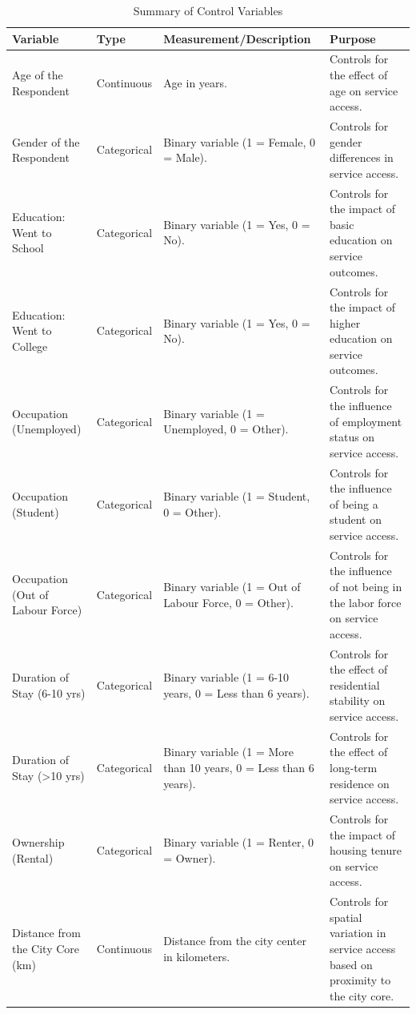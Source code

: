 \begin{table}[H]
\small  %
\centering
\caption{Summary of Control Variables}
\begin{tabularx}{\textwidth}{|p{3cm}|p{2.5cm}|p{5cm}|p{5cm}|}
\hline
\textbf{Variable} & \textbf{Type} & \textbf{Measurement/Description} & \textbf{Purpose} \\
\hline
Age of the Respondent & Continuous & Age in years. & Controls for the effect of age on service access. \\
\hline
Gender of the Respondent & Categorical & Binary variable (1 = Female, 0 = Male). & Controls for gender differences in service access. \\
\hline
Education: Went to School & Categorical & Binary variable (1 = Yes, 0 = No). & Controls for the impact of basic education on service outcomes. \\
\hline
Education: Went to College & Categorical & Binary variable (1 = Yes, 0 = No). & Controls for the impact of higher education on service outcomes. \\
\hline
Occupation (Unemployed) & Categorical & Binary variable (1 = Unemployed, 0 = Other). & Controls for the influence of employment status on service access. \\
\hline
Occupation (Student) & Categorical & Binary variable (1 = Student, 0 = Other). & Controls for the influence of being a student on service access. \\
\hline
Occupation (Out of Labour Force) & Categorical & Binary variable (1 = Out of Labour Force, 0 = Other). & Controls for the influence of not being in the labor force on service access. \\
\hline
Duration of Stay (6-10 yrs) & Categorical & Binary variable (1 = 6-10 years, 0 = Less than 6 years). & Controls for the effect of residential stability on service access. \\
\hline
Duration of Stay (>10 yrs) & Categorical & Binary variable (1 = More than 10 years, 0 = Less than 6 years). & Controls for the effect of long-term residence on service access. \\
\hline
Ownership (Rental) & Categorical & Binary variable (1 = Renter, 0 = Owner). & Controls for the impact of housing tenure on service access. \\
\hline
Distance from the City Core (km) & Continuous & Distance from the city center in kilometers. & Controls for spatial variation in service access based on proximity to the city core. \\
\hline  %
\end{tabularx}
\end{table}


